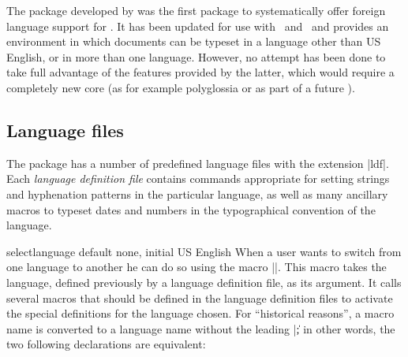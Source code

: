 The package  developed by  was the first package to systematically offer foreign language
support for \latex. It has been updated for use with \XeTeX\ and \LuaTeX\ and provides an environment
in which documents can be typeset in a language
other than US English, or in more than one language.
However, no attempt has been done to
take full advantage of the features provided by the
latter, which would require a completely new core
(as for example polyglossia or as part of a future ).

\subsection{Language files}
The package has a number of predefined language files with the extension |ldf|. Each \emph{language definition file} contains commands appropriate for setting strings and hyphenation patterns in the particular language, as well as
many ancillary macros to typeset dates and numbers in the typographical convention of the language. 


\begin{docCommand} {selectlanguage} {} {default none, initial US English}
When a user wants to switch from one language to another he can
do so using the macro |\selectlanguage|. This macro takes the
language, defined previously by a language definition file, as
its argument. It calls several macros that should be defined in
the language definition files to activate the special definitions
for the language chosen. For ``historical reasons'', a macro name is
converted to a language name without the leading |\|; in other words,
the two following declarations are equivalent:
\end{docCommand}
\begin{phdverbatim}
\selectlanguage{\german}
\end{phdverbatim}


